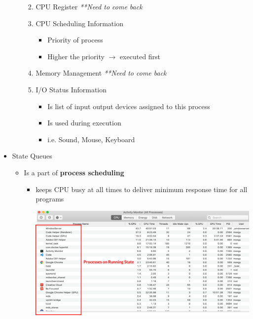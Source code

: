 \documentclass[12pt]{article}
\begin{document}
\begin{itemize}
\begin{itemize}
\begin{enumerate}
\begin{itemize}
            \end{itemize}
            \item CPU Register \textit{**Need to come back}
            \item CPU Scheduling Information
            \begin{itemize}
                \item Priority of process
                \item Higher the priority $\to$ executed first
            \end{itemize}
            \item Memory Management \textit{**Need to come back}
            \item I/O Status Information
            \begin{itemize}
                \item Is list of input output devices assigned to this process
                \item Is used during execution
                \item i.e. Sound, Mouse, Keyboard
            \end{itemize}
        \end{enumerate}
    \end{itemize}

    \item State Queues

    \begin{itemize}
        \item Is a part of \textbf{process scheduling}
        \begin{itemize}
            \item keeps CPU busy at all times to deliver minimum response time
            for all programs

            \begin{center}
            \includegraphics[width=\linewidth]{images/week_1_notes_1_6.png}
            \end{center}


\end{itemize}
\end{itemize}
\end{itemize}
\end{document}
